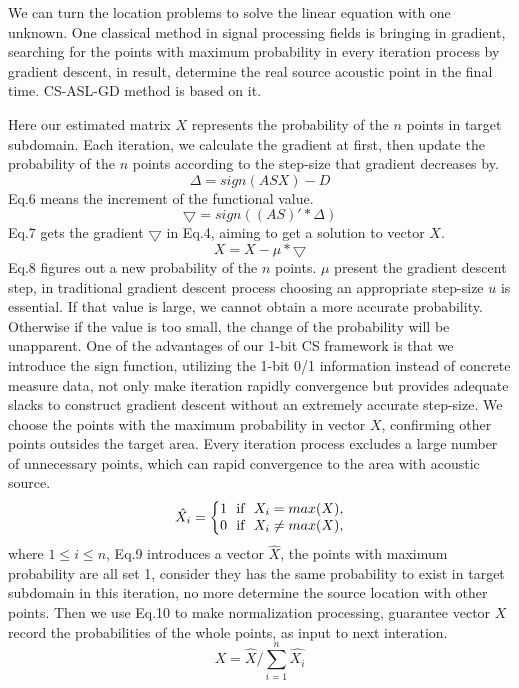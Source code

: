 We can turn the location problems to solve the linear equation with one unknown. One classical method in signal processing fields is bringing in gradient, searching for the points with maximum probability in every iteration process by gradient descent, in result, determine the real source acoustic point in the final time. CS-ASL-GD method is based on it.

Here our estimated matrix $X$ represents the probability of the $n$ points in target subdomain. Each iteration, we calculate the gradient at first, then update the probability of the $n$ points according to the step-size that gradient decreases by. 
\begin{equation}\label{eq:eps}
\varDelta=sign(ASX)-D
 \end{equation}Eq.6 means the increment of the functional value.
 \begin{equation}\label{eq:eps}
\bigtriangledown=sign((AS)'*\varDelta)
 \end{equation}Eq.7 gets the gradient $\bigtriangledown$ in Eq.4, aiming to get a solution to vector $X$. 
 \begin{equation}\label{eq:eps}
X=X-\mu *\bigtriangledown
 \end{equation}Eq.8 figures out a new probability of the $n$ points. $\mu$ present the gradient descent step, in traditional gradient descent process choosing an appropriate step-size $u$ is essential. If that value is large, we cannot obtain a more accurate probability. Otherwise if the value is too small, the change of the probability will be unapparent. One of the advantages of our 1-bit CS framework is that we introduce the sign function,  utilizing the 1-bit 0/1 information instead of concrete measure data, not only make iteration rapidly convergence but provides adequate slacks to construct gradient descent without an extremely accurate step-size. We choose the points with the maximum probability in vector $X$, confirming other points outsides the target area. Every iteration process excludes a large number of unnecessary points, which can rapid convergence to the area with acoustic source.
 \begin{equation}\label{eq:eps}
\hat{X_{i}}=
\left\{\begin{matrix}
1 ~~ $if$~~    X_i=max(X),\\
0 ~~ $if$~~   X_i \neq max(X),
\end{matrix}\right.
 \end{equation}where $1\leq i \leq n$, Eq.9 introduces a vector $\hat{X}$,  the points with maximum probability are all set 1, consider they  has the same probability to exist in target subdomain in this iteration,  no more determine the source location with other points. Then we use Eq.10 to make normalization processing, guarantee vector $X$ record the probabilities of the whole points, as input to next interation.
 \begin{equation}\label{eq:eps}
 X=\hat{X}/\sum\limits_{i=1}^n\hat{X_{i}}
 \end{equation}
 
